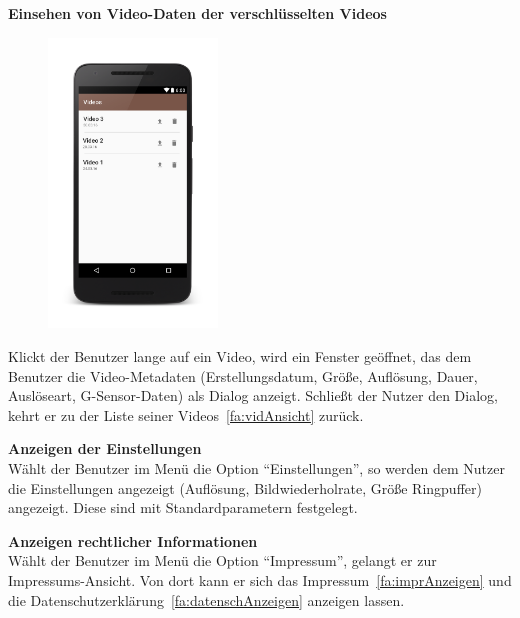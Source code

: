\begin{enumerate}
\item \label{fa:metaVerschlVid}
\textbf{Einsehen von Video-Daten der verschlüsselten Videos} \hfill \\
\begin{minipage}[t]{\linewidth}
	\begin{figure}
		\vspace{-35pt}
  		\begin{center}
   			\includegraphics[width=0.4\textwidth]{subtopicsFuncspec/Res/Mockups/Videos_list1_phone.png}
  		\end{center}
  		\vspace{-20pt}
  		\vspace{-10pt}
	\end{figure}
Klickt der Benutzer lange auf ein Video, wird ein Fenster geöffnet, das dem Benutzer die Video-\gls{Metadaten} (Erstellungsdatum, Größe, Auflösung, Dauer, Auslöseart, \gls{G-Sensor}-Daten) als Dialog anzeigt. Schließt der Nutzer den Dialog, kehrt er zu der Liste seiner Videos~\eqref{fa:vidAnsicht} zurück.

\item \label{fa:einstAnsicht}\textbf{Anzeigen der Einstellungen} \hfill \\
Wählt der Benutzer im Menü die Option ``Einstellungen'', so werden dem Nutzer die Einstellungen angezeigt (Auflösung, Bildwiederholrate, Größe \gls{Ringpuffer}) angezeigt. Diese sind mit Standardparametern festgelegt.

\item \label{fa:imprAnsicht}\textbf{Anzeigen rechtlicher Informationen} \hfill \\
Wählt der Benutzer im Menü die Option ``Impressum'', gelangt er zur Impressums-Ansicht. Von dort kann er sich das Impressum~\eqref{fa:imprAnzeigen} und die Datenschutzerklärung~\eqref{fa:datenschAnzeigen} anzeigen lassen.
\end{minipage}


\end{enumerate}
